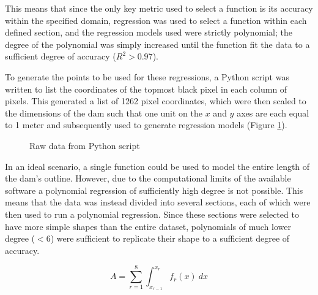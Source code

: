 \documentclass{article}
\begin{document}
    This means that since the only key metric used to select a function is its accuracy within the specified domain, regression was used to select a function within each defined section, and the regression models used were strictly polynomial; the degree of the polynomial was simply increased until the function fit the data to a sufficient degree of accuracy ($R^2 > 0.97$).

    To generate the points to be used for these regressions, a Python script was written to list the coordinates of the topmost black pixel in each column of pixels. This generated a list of 1262 pixel coordinates, which were then scaled to the dimensions of the dam such that one unit on the $x$ and $y$ axes are each equal to 1 meter and subsequently used to generate regression models (Figure \ref{figRawData}).

    \begin{figure}
        \centering
        \caption{Raw data from Python script}
        \label{figRawData}
    \end{figure}

    In an ideal scenario, a single function could be used to model the entire length of the dam's outline. However, due to the computational limits of the available software a polynomial regression of sufficiently high degree is not possible. This means that the data was instead divided into several sections, each of which were then  used to run a polynomial regression. Since these sections were selected to have more simple shapes than the entire dataset, polynomials of much lower degree ($< 6$) were sufficient to replicate their shape to a sufficient degree of accuracy.

    \begin{equation}
       A = \sum_{r=1}^8 \int_{x_{r-1}}^{x_r} f_r(x)\ {dx}
    \end{equation}
 
\end{document}
